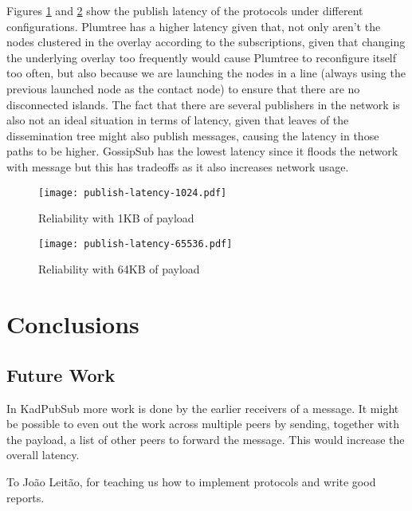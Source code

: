 \documentclass[sigconf]{acmart}
\begin{document}
Figures \ref{fig:publish-latency-1024} and \ref{fig:publish-latency-65536} show the publish latency of the protocols under different configurations. Plumtree has a higher latency given that, not only aren't the nodes clustered in the overlay according to the subscriptions, given that changing the underlying overlay too frequently would cause Plumtree to reconfigure itself too often, but also because we are launching the nodes in a line (always using the previous launched node as the contact node) to ensure that there are no disconnected islands. The fact that there are several publishers in the network is also not an ideal situation in terms of latency, given that leaves of the dissemination tree might also publish messages, causing the latency in those paths to be higher. GossipSub has the lowest latency since it floods the network with message but this has tradeoffs as it also increases network usage.

\begin{figure}[htp]
    \centering
    \texttt{[image: publish-latency-1024.pdf]}
    \caption{Reliability with 1KB of payload}
    \label{fig:publish-latency-1024}
\end{figure}

\begin{figure}[htp]
    \centering
    \texttt{[image: publish-latency-65536.pdf]}
    \caption{Reliability with 64KB of payload}
    \label{fig:publish-latency-65536}
\end{figure}

\section{Conclusions}



\subsection{Future Work}
In KadPubSub more work is done by the earlier receivers of a message. It might be possible to even out the work across multiple peers by sending, together with the payload, a list of other peers to forward the message. This would increase the overall latency.

\begin{acks}
    To João Leitão, for teaching us how to implement protocols and write good reports.
	\end{acks}



\end{document}
